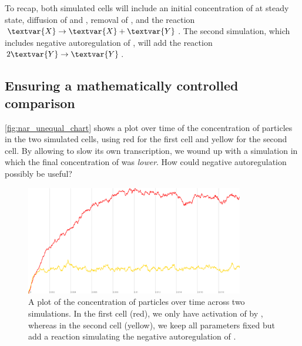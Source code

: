 To recap, both simulated cells will include an initial concentration of  at steady state, diffusion of  and , removal of , and the reaction $\textvar{X} \rightarrow \textvar{X} + \textvar{Y}$. The second simulation, which includes negative autoregulation of , will add the reaction $2\textvar{Y} \rightarrow \textvar{Y}$.\\

\begin{note}\end{note}

\FloatBarrier
{}
\subsection{Ensuring a mathematically controlled comparison}

\autoref{fig:nar_unequal_chart} shows a plot over time of the concentration of  particles in the two simulated cells, using red for the first cell and yellow for the second cell. By allowing  to slow its own transcription, we wound up with a simulation in which the final concentration of  was \textit{lower}. How could negative autoregulation possibly be useful?

\begin{figure}[h]
\centering
\mySfFamily
\includegraphics[width = 0.85\textwidth]{../images/cellblender_nar_unequal_chart_white.png}
\caption{A plot of the concentration of  particles over time across two simulations. In the first cell (red), we only have activation of  by , whereas in the second cell (yellow), we keep all parameters fixed but add a reaction simulating the negative autoregulation of .}
\label{fig:nar_unequal_chart}
\end{figure}

